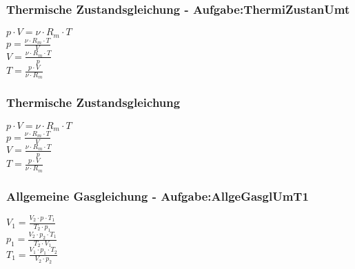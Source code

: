 \subsubsection{Thermische Zustandsgleichung - Aufgabe:ThermiZustanUmt} 
\begin{minipage}{0.45\textwidth} 
$ p\cdot V =\nu \cdot R_{m} \cdot T $\\ 
$ p =\frac{\nu \cdot R_{m} \cdot T}{  V} $\\ 
$ V =\frac{\nu \cdot R_{m} \cdot T}{  p} $\\ 
$ T =\frac{p\cdot V}{\nu \cdot R_{m} } $\\ 
\end{minipage} 
\begin{minipage}{0.45\textwidth} 
 
\end{minipage} 
\subsubsection{Thermische Zustandsgleichung} 
\begin{minipage}{0.45\textwidth} 
$ p\cdot V =\nu \cdot R_{m} \cdot T $\\ 
$ p =\frac{\nu \cdot R_{m} \cdot T}{  V} $\\ 
$ V =\frac{\nu \cdot R_{m} \cdot T}{  p} $\\ 
$ T =\frac{p\cdot V}{\nu \cdot R_{m} } $\\ 
\end{minipage} 
\begin{minipage}{0.45\textwidth} 
 
\end{minipage} 
\subsubsection{Allgemeine Gasgleichung - Aufgabe:AllgeGasglUmT1} 
\begin{minipage}{0.45\textwidth} 
$ V_{1}  = \frac{V_{2} \cdot p_{} \cdot T_{1} }{  T_{2} \cdot p_{1} } $\\ 
$ p_{1}  = \frac{V_{2} \cdot p_{2} \cdot T_{1} }{  T_{2} \cdot V_{1} } $\\ 
$ T_{1}  = \frac{V_{1} \cdot p_{1} \cdot T_{2} }{  V_{2} \cdot p_{2} } $\\ 
\end{minipage} 
\begin{minipage}{0.45\textwidth} 
 
\end{minipage} 
